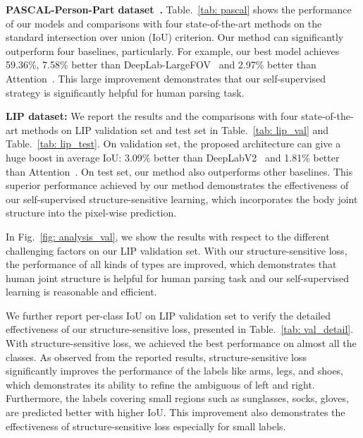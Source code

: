 \documentclass[10pt,twocolumn,letterpaper]{article}
\begin{document}
\textbf{PASCAL-Person-Part dataset~\cite{chen2014detect}.}
Table.~\ref{tab: pascal} shows the performance of our models and comparisons with four state-of-the-art methods on the standard intersection over union (IoU) criterion. Our method can significantly outperform four baselines, particularly. For example, our best model achieves 59.36\%, 7.58\% better than DeepLab-LargeFOV~\cite{chen2014semantic} and 2.97\% better than Attention~\cite{chen2015attention}. This large improvement demonstrates that our self-supervised strategy is significantly helpful for human parsing task.

\textbf{LIP dataset:}
We report the results and the comparisons with four state-of-the-art methods on LIP validation set and test set in Table.~\ref{tab: lip_val} and Table.~\ref{tab: lip_test}. On validation set, the proposed architecture can give a huge boost in average IoU: 3.09\% better than DeepLabV2~\cite{chen2014semantic} and 1.81\% better than Attention~\cite{chen2015attention}. On test set, our method also outperforms other baselines. This superior performance achieved by our method demonstrates the effectiveness of our self-supervised structure-sensitive learning, which incorporates the body joint structure into the pixel-wise prediction.

In Fig.~\ref{fig: analysis_val}, we show the results with respect to the different challenging factors on our LIP validation set. With our structure-sensitive loss, the performance of all kinds of types are improved, which demonstrates that human joint structure is helpful for human parsing task and our self-supervised learning is reasonable and efficient.

We further report per-class IoU on LIP validation set to verify the detailed effectiveness of our structure-sensitive loss, presented in Table.~\ref{tab: val_detail}. With structure-sensitive loss, we achieved the best performance on almost all the classes. As observed from the reported results, structure-sensitive loss significantly improves the performance of the labels like arms, legs, and shoes, which demonstrates its ability to refine the ambiguous of left and right. Furthermore, the labels covering small regions such as sunglasses, socks, gloves, are predicted better with higher IoU. This improvement also demonstrates the effectiveness of structure-sensitive loss especially for small labels.
\end{document}
